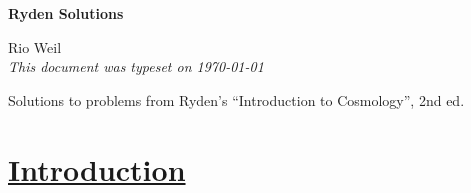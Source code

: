 \documentclass[10pt]{article}
\numberwithin{equation}{section}
\begin{document}
\begin{tcolorbox}
  \begin{center}
  \begin{Large}
    \textbf{Ryden Solutions} \\
    \vspace{5pt}
  \end{Large}
  \begin{large}
        Rio Weil \\
\vspace{5pt}
    \emph{This document was typeset on \today}
  \end{large}
  \end{center}
\end{tcolorbox}

\begin{center}
  Solutions to problems from Ryden's ``Introduction to Cosmology'', 2nd ed.

\end{center}
\tableofcontents

\newpage
\section[Introduction]{\hyperlink{toc}{Introduction}}

\newpage 

\newpage 

\newpage

\newpage

\newpage

\newpage

\newpage

\newpage

\newpage

\newpage

\end{document}
